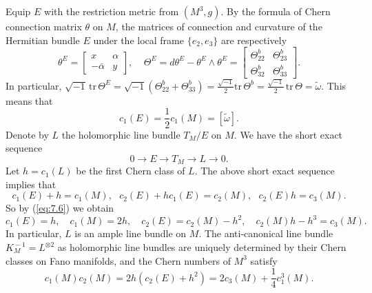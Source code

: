 \documentclass{amsart}
\numberwithin{equation}{section}
\theoremstyle{definition}
\renewcommand{\1}{\mathds{1}}
\renewcommand{\>}{\rightarrow}
\begin{document}
Equip $E$ with the restriction metric from $(M^3,g)$. By the formula of Chern connection matrix $\theta$ on $M$, the matrices of connection and curvature of the Hermitian bundle $E$ under the local frame $\{ e_2, e_3\}$ are respectively
$$ \theta^E = \begin{bmatrix} x & \alpha \\ -\overline{\alpha} & y \end{bmatrix}\!\!, \ \ \ \  \ \Theta^E = d\theta^E -\theta^E \wedge \theta^E = \begin{bmatrix} \Theta^b_{22} & \Theta^b_{23} \\ \Theta^b_{32} & \Theta^b_{33} \end{bmatrix}\!\!.$$
In particular, $\sqrt{-1}\,\mathrm{tr}\,\Theta^E = \sqrt{-1}(\Theta^b_{22} + \Theta^b_{33}) = \frac{\sqrt{-1}}{2}\mathrm{tr}\,\Theta^b = \frac{\sqrt{-1}}{2}\,\mathrm{tr}\,\Theta = \tilde{\omega}$. This means that
\begin{equation} \label{eq:7.6}
 c_1(E) = \frac{1}{2} c_1(M) = [\tilde{\omega}].
\end{equation}
Denote by $L$ the holomorphic line bundle $T_{\!M}/E$ on $M$. We have  the short exact sequence
\begin{equation} \label{eq:7.7}
0 \rightarrow E \rightarrow T_{\!M} \rightarrow L \rightarrow 0.
\end{equation}
Let $h=c_1(L)$ be the first Chern class of $L$. The above short exact sequence implies that
$$ c_1(E)+h =c_1(M), \ \ \ c_2(E) + hc_1(E) = c_2(M), \ \ \ c_2(E)h =c_3(M).$$
So by (\ref{eq:7.6}) we obtain
\[c_1(E)=h, \quad c_1(M)=2h, \quad c_2(E)=c_2(M)-h^2, \quad c_2(M)h - h^3=c_3(M).\]
In particular, $L$ is an ample line bundle on $M$. The anti-canonical line bundle $K_{\!M}^{\!-\!1}=L^{\otimes 2}$ as holomorphic line bundles are uniquely determined by their Chern classes on Fano manifolds, and the Chern numbers of $M^3$ satisfy
\begin{equation}  \label{eq:7.8}
c_1(M)c_2(M) = 2h (c_2(E)+h^2) = 2c_3(M) + \frac{1}{4}c_1^3(M).
\end{equation}
\end{document}
